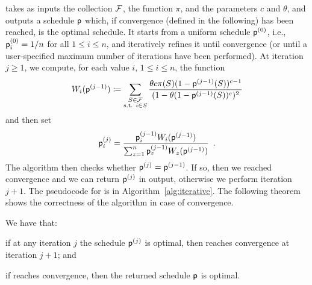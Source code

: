 \algoname takes as inputs the collection $\mathcal{F}$, the function $\pi$, and the
parameters $c$ and $\theta$, and outputs a schedule $\mathsf{p}$ which, if
convergence (defined in the following) has been reached, is the optimal
schedule. It starts from a uniform schedule $\mathsf{p}^{(0)}$, i.e.,
$\mathsf{p}^{(0)}_i=1/n$ for all $1\le i\le n$, and iteratively refines it until
convergence (or until a user-specified maximum number of iterations have been
performed). At iteration $j\ge 1$, we compute, for each value $i$, $1\le i\le
n$, the function
\begin{equation}\label{eq:functionw}
	W_i(\sched^{(j-1)}) \defeq \sum_{\substack{S \in \family \\
		\mbox{\scriptsize{s.t. }} i\in
S}} \frac{\theta c \pi(S)
	(1-\sched^{(j-1)}(S))^{c-1}}{(1-\theta(1-\sched^{(j-1)}(S))^c)^2}
\end{equation}
and then set
\[
	\mathsf{p}^{(j)}_i = \frac{\mathsf{p}^{(j-1)}_i W_i(\mathsf{p}^{(j-1)})}{\sum_{z=1}^n
	\mathsf{p}^{(j-1)}_z W_z(\mathsf{p}^{(j-1)})}\enspace.
\]
The algorithm then checks whether $\mathsf{p}^{(j)}=\mathsf{p}^{(j-1)}$. If so, then we
reached convergence and we can return $\mathsf{p}^{(j)}$ in output, otherwise we
perform iteration $j+1$. The pseudocode for \algoname is in
Algorithm~\ref{alg:iterative}. The following theorem shows the correctness of
the algorithm in case of convergence.

\begin{theorem}\label{thm:optimal}
	We have that:
	\begin{enumerate*}
		\item if at any iteration $j$ the schedule $\mathsf{p}^{(j)}$ is optimal,
			then \algoname reaches convergence at iteration $j+1$; and
		\item if \algoname reaches convergence, then the returned schedule
			$\mathsf{p}$ is optimal.
	\end{enumerate*}
\end{theorem}

